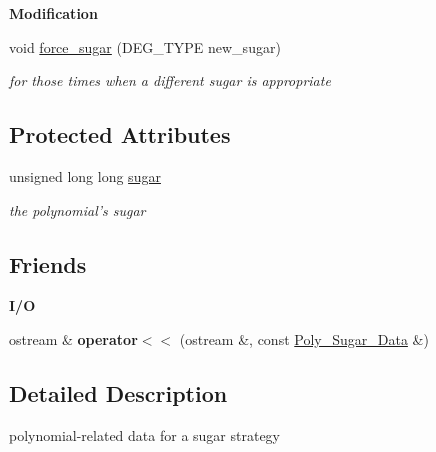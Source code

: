 \begin{Indent}\textbf{ Modification}\par
\begin{DoxyCompactItemize}
\item 
\mbox{\label{class_poly___sugar___data_a945416871509370e2222c8c7abe01759}} 
void \hyperlink{class_poly___sugar___data_a945416871509370e2222c8c7abe01759}{force\+\_\+sugar} (D\+E\+G\+\_\+\+T\+Y\+PE new\+\_\+sugar)
\begin{DoxyCompactList}\small\item\em for those times when a different sugar is appropriate \end{DoxyCompactList}\end{DoxyCompactItemize}
\end{Indent}
\subsection*{Protected Attributes}
\begin{DoxyCompactItemize}
\item 
\mbox{\label{class_poly___sugar___data_a125902ea0a800d9545937930e4537040}} 
unsigned long long \hyperlink{class_poly___sugar___data_a125902ea0a800d9545937930e4537040}{sugar}
\begin{DoxyCompactList}\small\item\em the polynomial's sugar \end{DoxyCompactList}\end{DoxyCompactItemize}
\subsection*{Friends}
\begin{Indent}\textbf{ I/O}\par
\begin{DoxyCompactItemize}
\item 
\mbox{\label{class_poly___sugar___data_ade466c9119513ef40b2b6220a98a72e6}} 
ostream \& {\bfseries operator$<$$<$} (ostream \&, const \hyperlink{class_poly___sugar___data}{Poly\+\_\+\+Sugar\+\_\+\+Data} \&)
\end{DoxyCompactItemize}
\end{Indent}


\subsection{Detailed Description}
polynomial-\/related data for a sugar strategy 

